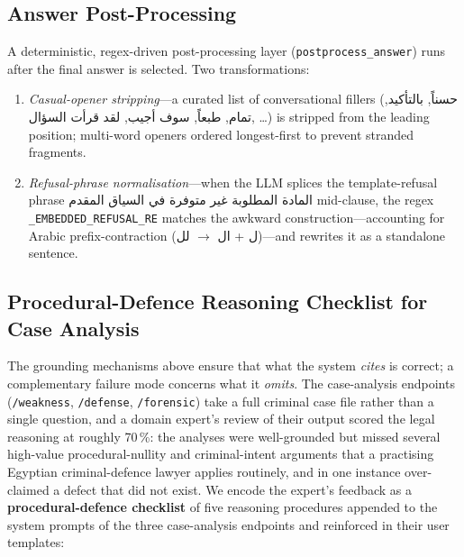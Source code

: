 \documentclass[final,1p,times]{elsarticle}
\newcommand{\ar}[1]{{\arabicfont\beginR #1\endR}}
\begin{document}
\subsection{Answer Post-Processing}\label{sec:postproc}

A deterministic, regex-driven post-processing layer
(\texttt{postprocess\_answer}) runs after the final answer is selected.
Two transformations:
\begin{enumerate}
  \item \emph{Casual-opener stripping}---a curated list of conversational
        fillers (\ar{حسناً}, \ar{بالتأكيد}, \ar{تمام}, \ar{طبعاً},
        \ar{سوف أجيب}, \ar{لقد قرأت السؤال}, \ldots) is stripped from the
        leading position; multi-word openers ordered longest-first to
        prevent stranded fragments.
  \item \emph{Refusal-phrase normalisation}---when the LLM splices the
        template-refusal phrase \ar{المادة المطلوبة غير متوفرة في السياق
        المقدم} mid-clause, the regex \texttt{\_EMBEDDED\_REFUSAL\_RE}
        matches the awkward construction---accounting for Arabic
        prefix-contraction (\ar{ل + ال} $\rightarrow$ \ar{لل})---and rewrites
        it as a standalone sentence.
\end{enumerate}

\subsection{Procedural-Defence Reasoning Checklist for Case Analysis}\label{sec:checklist}

The grounding mechanisms above ensure that what the system \emph{cites} is
correct; a complementary failure mode concerns what it \emph{omits}. The
case-analysis endpoints (\texttt{/weakness}, \texttt{/defense},
\texttt{/forensic}) take a full criminal case file rather than a single
question, and a domain expert's review of their output scored the legal
reasoning at roughly 70\,\%: the analyses were well-grounded but missed
several high-value procedural-nullity and criminal-intent arguments that a
practising Egyptian criminal-defence lawyer applies routinely, and in one
instance over-claimed a defect that did not exist. We encode the expert's
feedback as a \textbf{procedural-defence checklist} of five reasoning
procedures appended to the system prompts of the three case-analysis
endpoints and reinforced in their user templates:
\end{document}
